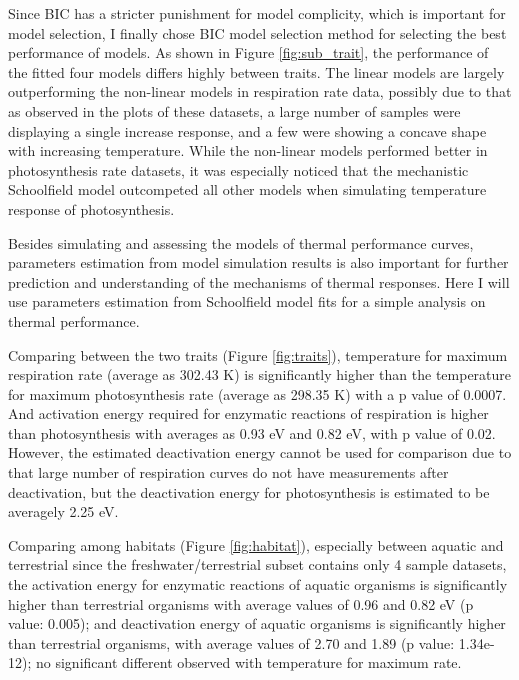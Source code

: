 \documentclass[11pt, a4paper]{article}
\begin{document}
\begin{spacing}{1.5}
Since BIC has a stricter punishment for model complicity, which is important for model selection, I finally chose BIC model selection method for selecting the best performance of models. As shown in Figure \ref{fig:sub_trait}, the performance of the fitted four models differs highly between traits. The linear models are largely outperforming the non-linear models in respiration rate data, possibly due to that as observed in the plots of these datasets, a large number of samples were displaying a single increase response, and a few were showing a concave shape with increasing temperature. While the non-linear models performed better in photosynthesis rate datasets, it was especially noticed that the mechanistic Schoolfield model outcompeted all other models when simulating temperature response of photosynthesis. 

Besides simulating and assessing the models of thermal performance curves, parameters estimation from model simulation results is also important for further prediction and understanding of the mechanisms of thermal responses. Here I will use parameters estimation from Schoolfield model fits for a simple analysis on thermal performance. 

Comparing between the two traits (Figure \ref{fig:traits}), temperature for maximum respiration rate (average as 302.43 K) is significantly higher than the temperature for maximum photosynthesis rate (average as 298.35 K) with a p value of 0.0007. And activation energy required for enzymatic reactions of respiration is higher than photosynthesis with averages as 0.93 eV and 0.82 eV, with p value of 0.02. However, the estimated deactivation energy cannot be used for comparison due to that large number of respiration curves do not have measurements after deactivation, but the deactivation energy for photosynthesis is estimated to be averagely 2.25 eV. 

Comparing among habitats (Figure \ref{fig:habitat}), especially between aquatic and terrestrial since the freshwater/terrestrial subset contains only 4 sample datasets, the activation energy for enzymatic reactions of aquatic organisms is significantly higher than terrestrial organisms with average values of 0.96 and 0.82 eV (p value: 0.005); and deactivation energy of aquatic organisms is significantly higher than terrestrial organisms, with average values of 2.70 and 1.89 (p value: 1.34e-12); no significant different observed with temperature for maximum rate. 


\end{spacing}
\end{document}

